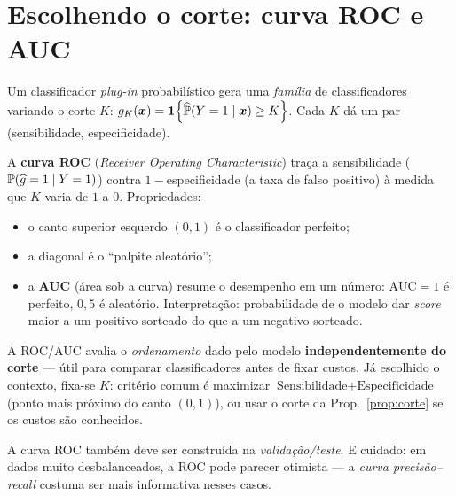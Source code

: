 \documentclass[11pt,a4paper]{article}
\begin{document}
\section{Escolhendo o corte: curva ROC e AUC}
Um classificador \emph{plug-in} probabilístico gera uma \emph{família} de
classificadores variando o corte $K$: $g_K(\bm{x})=\mathbf{1}\!\left\{\widehat{\mathbb{P}}(Y=1\mid\bm{x})\ge K\right\}$.
Cada $K$ dá um par (sensibilidade, especificidade).

A \textbf{curva ROC} (\emph{Receiver Operating Characteristic}) traça a
sensibilidade ($\mathbb{P}(\widehat{g}=1\mid Y=1)$) contra $1-$especificidade (a taxa de falso
positivo) à medida que $K$ varia de $1$ a $0$. Propriedades:
\begin{itemize}[leftmargin=1.4cm,nosep]
  \item o canto superior esquerdo $(0,1)$ é o classificador perfeito;
  \item a diagonal é o ``palpite aleatório'';
  \item a \textbf{AUC} (área sob a curva) resume o desempenho em um número:
        $\text{AUC}=1$ é perfeito, $0{,}5$ é aleatório. Interpretação:
        probabilidade de o modelo dar \emph{score} maior a um positivo sorteado do
        que a um negativo sorteado.
\end{itemize}

\begin{ideia}
A ROC/AUC avalia o \emph{ordenamento} dado pelo modelo \textbf{independentemente do
corte} --- útil para comparar classificadores antes de fixar custos. Já escolhido o
contexto, fixa-se $K$: critério comum é maximizar
$\text{Sensibilidade}+\text{Especificidade}$ (ponto mais próximo do canto
$(0,1)$), ou usar o corte da Prop.~\ref{prop:corte} se os custos são conhecidos.
\end{ideia}

\begin{atencao}
A curva ROC também deve ser construída na \emph{validação/teste}. E cuidado: em
dados muito desbalanceados, a ROC pode parecer otimista --- a \emph{curva
precisão--recall} costuma ser mais informativa nesses casos.
\end{atencao}

\end{document}
